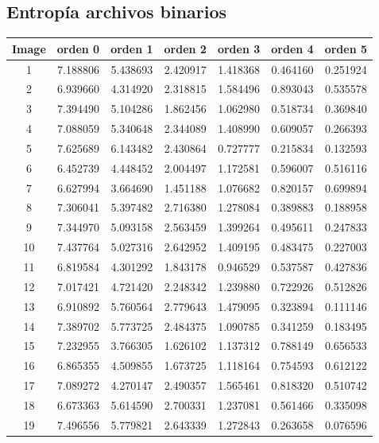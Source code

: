\documentclass[12pt]{article}
\begin{document}
\subsection*{Entropía archivos binarios}
\begin{table}[h]
	\centering
	\label{tab:label}
	\begin{tabular}{|c|c|c|c|c|c|c|}
		\hline
		Image & orden 0 & orden 1 & orden 2 & orden 3 & orden 4 & orden 5\\
		\hline
		1 &7.188806 &5.438693 &2.420917 &1.418368 &0.464160 &0.251924 \\
		\hline
		2 &6.939660 &4.314920 &2.318815 &1.584496 &0.893043 &0.535578 \\
		\hline
		3 &7.394490 &5.104286 &1.862456 &1.062980 &0.518734 &0.369840 \\
		\hline
		4 &7.088059 &5.340648 &2.344089 &1.408990 &0.609057 &0.266393 \\
		\hline
		5 &7.625689 &6.143482 &2.430864 &0.727777 &0.215834 &0.132593 \\
		\hline
		6 &6.452739 &4.448452 &2.004497 &1.172581 &0.596007 &0.516116 \\
		\hline
		7 &6.627994 &3.664690 &1.451188 &1.076682 &0.820157 &0.699894 \\
		\hline
		8 &7.306041 &5.397482 &2.716380 &1.278084 &0.389883 &0.188958 \\
		\hline
		9 &7.344970 &5.093158 &2.563459 &1.399264 &0.495611 &0.247833 \\
		\hline
		10&7.437764 &5.027316 &2.642952 &1.409195 &0.483475 &0.227003 \\
		\hline
		11&6.819584 &4.301292 &1.843178 &0.946529 &0.537587 &0.427836 \\
		\hline
		12&7.017421 &4.721420 &2.248342 &1.239880 &0.722926 &0.512826 \\
		\hline
		13&6.910892 &5.760564 &2.779643 &1.479095 &0.323894 &0.111146 \\
		\hline
		14&7.389702 &5.773725 &2.484375 &1.090785 &0.341259 &0.183495 \\
		\hline
		15&7.232955 &3.766305 &1.626102 &1.137312 &0.788149 &0.656533 \\
		\hline
		16&6.865355 &4.509855 &1.673725 &1.118164 &0.754593 &0.612122 \\
		\hline
		17&7.089272 &4.270147 &2.490357 &1.565461 &0.818320 &0.510742 \\
		\hline
		18&6.673363 &5.614590 &2.700331 &1.237081 &0.561466 &0.335098 \\
		\hline
		19&7.496556 &5.779821 &2.643339 &1.272843 &0.263658 &0.076596 \\

\end{tabular}
\end{table}
\end{document}

